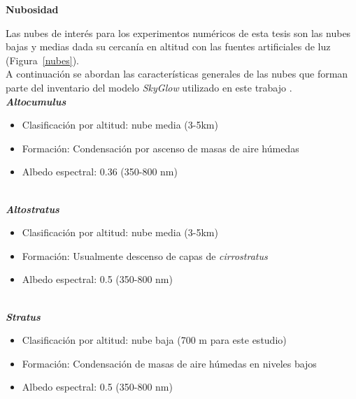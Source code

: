 \newpage

\textbf{Nubosidad}

Las nubes de interés para los experimentos numéricos de esta tesis son las nubes bajas y medias dada su cercanía en altitud con las fuentes artificiales de luz (Figura~\ref{nubes}).\\

A continuación se abordan las características generales de las nubes que forman parte del inventario del modelo \textit{SkyGlow} utilizado en este trabajo \citep{Cloudatlas1987,Solano2015}.\\

\textit{\textbf{Altocumulus}}

\begin{itemize}

    \item Clasificación por altitud: nube media (3-5km)
    
    \item Formación: Condensación por ascenso de masas de aire húmedas
    
    \item Albedo espectral: 0.36 (350-800 nm)
    
\end{itemize}

\\

\textit{\textbf{Altostratus}}

\begin{itemize}

    \item Clasificación por altitud: nube media (3-5km)
    
    \item Formación: Usualmente descenso de capas de \textit{cirrostratus}
    
    \item Albedo espectral: 0.5 (350-800 nm)
    
\end{itemize}

\\

\textit{\textbf{Stratus}}

\begin{itemize}

    \item Clasificación por altitud: nube baja (700 m para este estudio)
    
    \item Formación: Condensación de masas de aire húmedas en niveles bajos
    
    \item Albedo espectral: 0.5 (350-800 nm)
    
\end{itemize}

